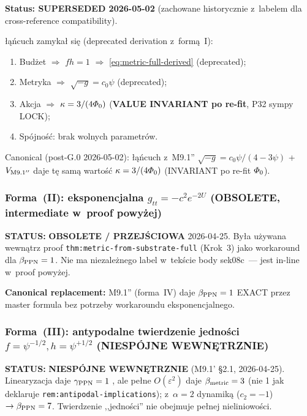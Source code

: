 \begin{remark}%
\label{rem:metric-action-consistency}
\textbf{Status: SUPERSEDED 2026-05-02} (zachowane historycznie
z~labelem dla cross-reference compatibility).

\l{}\k{a}\'ncuch zamyka\l{} si\k{e} (deprecated derivation z~form\k{a}~I):
\begin{enumerate}[nosep]
  \item Bud\.zet $\Rightarrow$ $fh = 1$ $\Rightarrow$
        \eqref{eq:metric-full-derived} (deprecated);
  \item Metryka $\Rightarrow$ $\sqrt{-g} = c_0\psi$ (deprecated);
  \item Akcja $\Rightarrow$ $\kappa = 3/(4\varPhi_0)$
        (\textbf{VALUE INVARIANT po re-fit}, P32 sympy LOCK);
  \item Sp\'ojno\'s\'c: brak wolnych parametr\'ow.
\end{enumerate}

Canonical (post-G.0 2026-05-02): \l{}\k{a}\'ncuch z~M9.1'' $\sqrt{-g} =
c_0\psi/(4-3\psi)$ + $V_{\rm M9.1''}$ daje t\k{e} sam\k{a} warto\'s\'c
$\kappa = 3/(4\varPhi_0)$ (INVARIANT po re-fit $\varPhi_0$).
\end{remark}

\subsubsection{Forma~(II): eksponencjalna $g_{tt} = -c^2 e^{-2U}$
(OBSOLETE, intermediate w~proof powy\.zej)}\label{app:metric-form-II}

\textbf{STATUS:} \textbf{OBSOLETE / PRZEJ\'SCIOWA} 2026-04-25.
By\l{}a u\.zywana wewn\k{a}trz proof
\texttt{thm:metric-from-substrate-full} (Krok~3) jako workaround dla
$\beta_{\rm PPN}=1$. Nie ma niezale\.znego label w~tek\'scie body
sek08c~--- jest in-line w~proof powy\.zej.

\textbf{Canonical replacement:} M9.1'' (forma~IV) daje $\beta_{\rm PPN}=1$
EXACT przez master formula bez potrzeby workaroundu eksponencjalnego.

\subsubsection{Forma~(III): antypodalne twierdzenie jedno\'sci
$f=\psi^{-1/2}, h=\psi^{+1/2}$ (NIESP\'OJNE WEWN\k{E}TRZNIE)}%
\label{app:metric-form-III}

\textbf{STATUS:} \textbf{NIESP\'OJNE WEWN\k{E}TRZNIE} (M9.1' \S2.1, 2026-04-25).
Linearyzacja daje $\gamma_{\rm PPN}=1$ \checkmark, ale pe\l{}ne $O(\varepsilon^2)$
daje $\beta_{\rm metric}=3$ (nie 1 jak deklaruje
\texttt{rem:antipodal-implications}); z~$\alpha=2$ dynamik\k{a}
($c_2=-1$) $\to \beta_{\rm PPN}=7$. Twierdzenie ,,jedno\'sci'' nie
obejmuje pe\l{}nej nieliniowo\'sci.

